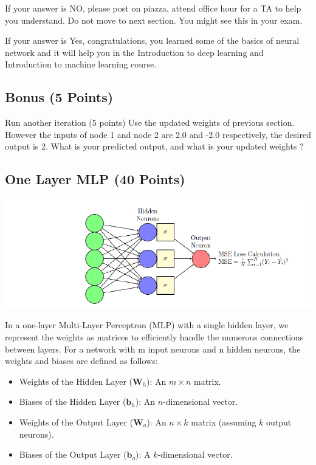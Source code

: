 \documentclass{article}
\begin{document}
If your answer is NO, please post on piazza, attend office hour for a TA to help you understand.
Do not move to next section. You might see this in your exam.


If your answer is Yes, congratulations, you learned some of the basics of neural network and it will help you
in the Introduction to deep learning and Introduction to machine learning course.

\subsection{Bonus (5 Points)}
Run another iteration (5 points) Use the updated weights of previous section. However the inputs of
node 1 and node 2 are 2.0 and -2.0 respectively, the desired output is 2. What is your predicted output, and
what is your updated weights ?

\subsection{One Layer MLP (40 Points)}

\begin{center}
    \includegraphics[scale=0.5]{nn1.png}
\end{center}
In a one-layer Multi-Layer Perceptron (MLP) with a single hidden layer, we represent the weights as matrices
to efficiently handle the numerous connections between layers. For a network with m input neurons and n
hidden neurons, the weights and biases are defined as follows:
\begin{itemize}
    \item Weights of the Hidden Layer ($\mathbf{W}_h$): An $m \times n$ matrix.
    \item Biases of the Hidden Layer ($\mathbf{b}_h$): An $n$-dimensional vector.
    \item Weights of the Output Layer ($\mathbf{W}_o$): An $n \times k$ matrix (assuming $k$ output neurons).
    \item Biases of the Output Layer ($\mathbf{b}_o$): A $k$-dimensional vector.
\end{itemize}
\end{document}
